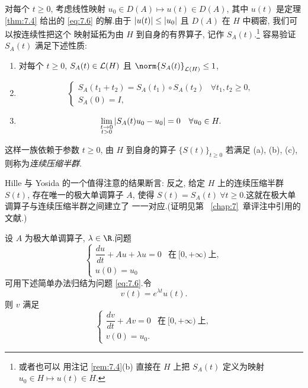 \begin{starremark}[压缩半群]
\label{rem:7.5}
对每个 $t\ge0$, 考虑线性映射 $u_0\in D(A)\mapsto u(t)\in D(A)$, 其中
$u(t)$ 是定理  \ref{thm:7.4} 给出的 \eqref{eq:7.6} 的解.由于
$\left|u(t)\right|\le\left|u_0\right|$ 且 $D(A)$ 在 $H$ 中稠密, 我们可以按连续性把这个
映射延拓为由 $H$ 到自身的有界算子, 记作 $S_A(t)$.\footnote{或者也可以
用注记 \ref{rem:7.4}(b) 直接在 $H$ 上把 $S_A(t)$ 定义为映射
$u_0\in H\mapsto u(t)\in H$.} 容易验证 $S_A(t)$ 满足下述性质:
\begin{enumerate}[label=(\alph*), leftmargin=2.2em, itemsep=0.2em]
	\item 对每个 $t\ge0$, $S_A(t)\in\mathcal{L}(H)$ 且
	      $\norm{S_A(t)}_{\LL(H)}\le1$,
	\item
	      \begin{equation*}
	      \begin{cases}
	      S_A(t_1+t_2)=S_A(t_1)\circ S_A(t_2) & \forall t_1,t_2\ge0,\\
	      S_A(0)=I,
	      \end{cases}
	      \end{equation*}
	\item
	      \begin{equation*}
	      \lim_{\substack{t\to0\\ t>0}}\left|S_A(t)u_0-u_0\right|=0
	      \quad\forall u_0\in H.
	      \end{equation*}
\end{enumerate}
这样一族依赖于参数 $t\ge0$, 由 $H$ 到自身的算子 $\{S(t)\}_{t\ge0}$ 若满足
(a), (b), (c), 则称为\emph{连续压缩半群}.

Hille 与 Yosida 的一个值得注意的结果断言: 反之, 给定 $H$ 上的连续压缩半群
$S(t)$, 存在唯一的极大单调算子 $A$, 使得
$S(t)=S_A(t)\ \forall t\ge0$.这就在极大单调算子与连续压缩半群之间建立了
一一对应.(证明见第~
\ref{chap:7}~章评注中引用的文献.)
\end{starremark}

\begin{keyremark}
\label{rem:7.6}
设 $A$ 为极大单调算子, $\lambda\in\R$.问题
\begin{equation*}
\begin{cases}
\dfrac{du}{dt}+Au+\lambda u=0 & \text{在}\ [0,+\infty)\ \text{上},\\
u(0)=u_0
\end{cases}
\end{equation*}
可用下述简单办法归结为问题 \eqref{eq:7.6}.令
\begin{equation*}
v(t)=e^{\lambda t}u(t).
\end{equation*}
则 $v$ 满足
\begin{equation*}
\begin{cases}
\dfrac{dv}{dt}+Av=0 & \text{在}\ [0,+\infty)\ \text{上},\\
v(0)=u_0.
\end{cases}
\end{equation*}
\end{keyremark}

